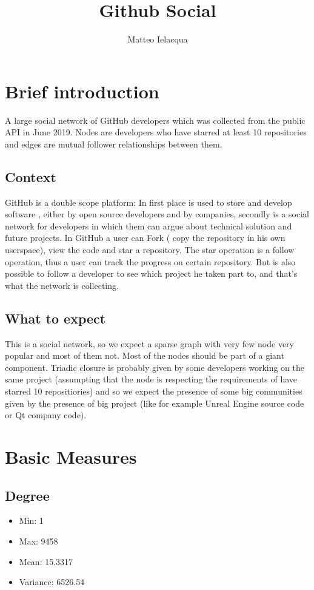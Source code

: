 \documentclass[]{article}
\begin{document}
\author{Matteo Ielacqua}
\title{Github Social}
\maketitle
    \section{Brief introduction}
    A large social network of GitHub developers which was collected from the public API in June 2019. Nodes are developers who have starred at least 10 repositories and edges are mutual follower relationships between them.
    \subsection*{Context}
    GitHub is a double scope platform: In first place is used to store and develop software , either by open source developers and by companies, secondly is a social network for developers in which them can argue about technical solution and future projects. In GitHub a user can Fork ( copy the repository in his own userspace), view the code and star a repository. The star operation is a follow operation, thus a user can track the progress on certain repository. But is also possible to follow a developer to see which project he taken part to, and that's what the network is collecting. 
    \subsection*{What to expect}
    This is a social network, so we expect a sparse graph with very few node very popular and most of them not. Most of the nodes should be part of a giant component. Triadic closure is probably given by some developers working on the same project (assumpting that the node is respecting the requirements of have starred 10 repositiories) and so we expect the presence of some big communities given by the presence of big project (like for example Unreal Engine source code or Qt company code).  

    \section{Basic Measures}
    
    \subsection*{Degree}
    \begin{itemize}
        \item Min: 1
        \item Max: 9458
        \item Mean: 15.3317
        \item Variance: 6526.54
    \end{itemize}
\end{document}
